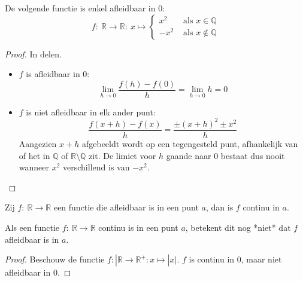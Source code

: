 \documentclass[main.tex]{subfiles}
\begin{document}
\begin{vb}
  De volgende functie is enkel afleidbaar in $0$:
  \[
  f:\ \mathbb{R}\rightarrow \mathbb{R}:\ x \mapsto
  \left\{
    \begin{array}{rl}
      x^{2} & \text{ als } x\in \mathbb{Q}\\
      -x^{2} & \text{ als } x \not \in \mathbb{Q}
    \end{array}
  \right.
  \]

  \begin{proof}
    In delen.
    \begin{itemize}
    \item $f$ is afleidbaar in $0$:\\
      \[ \lim_{h \rightarrow 0}\frac{f(h) - f(0)}{h} = \lim_{h \rightarrow 0}h = 0 \]
    \item $f$ is niet afleidbaar in elk ander punt:\\
        \[
        \frac{f(x+h)-f(x)}{h}
        = \frac{\pm(x+h)^{2}\pm x^{2}}{h}
        \]
        Aangezien $x+h$ afgebeeldt wordt op een tegengesteld punt, afhankelijk van of het in $\mathbb{Q}$ of $\mathbb{R} \setminus \mathbb{Q}$ zit. 
        De limiet voor $h$ gaande naar $0$ bestaat dus nooit wanneer $x^{2}$ verschillend is van $-x^{2}$.
    \end{itemize}
  \end{proof}
\end{vb}

\begin{st}
  Zij $f:\ \mathbb{R} \rightarrow \mathbb{R}$ een functie die afleidbaar is in een punt $a$, dan is $f$ continu in $a$.
\end{st}

\begin{tvb}
  Als een functie $f:\ \mathbb{R} \rightarrow \mathbb{R}$ continu is in een punt $a$, betekent dit nog *niet* dat $f$ afleidbaar is in $a$.

  \begin{proof}
    Beschouw de functie $f:| \mathbb{R} \rightarrow \mathbb{R}^{+}: x \mapsto |x|$.
    $f$ is continu in $0$, maar niet afleidbaar in $0$.
  \end{proof}
\end{tvb}

\end{document}
